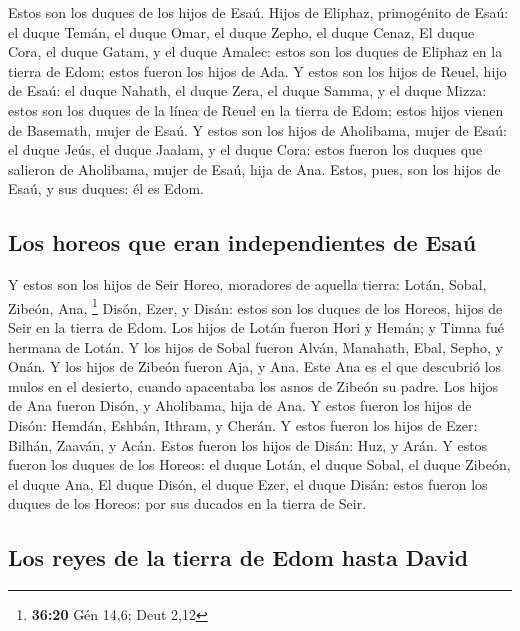  Estos son los duques de los hijos de Esaú. Hijos de
Eliphaz, primogénito de Esaú: el duque Temán, el duque Omar, el duque
Zepho, el duque Cenaz,  El duque Cora, el duque Gatam, y el
duque Amalec: estos son los duques de Eliphaz en la tierra de Edom;
estos fueron los hijos de Ada.  Y estos son los hijos de
Reuel, hijo de Esaú: el duque Nahath, el duque Zera, el duque Samma, y
el duque Mizza: estos son los duques de la línea de Reuel en la tierra
de Edom; estos hijos vienen de Basemath, mujer de Esaú.  Y
estos son los hijos de Aholibama, mujer de Esaú: el duque Jeús, el duque
Jaalam, y el duque Cora: estos fueron los duques que salieron de
Aholibama, mujer de Esaú, hija de Ana.  Estos, pues, son
los hijos de Esaú, y sus duques: él es Edom.

\hypertarget{los-horeos-que-eran-independientes-de-esauxfa}{%
\subsection{Los horeos que eran independientes de
Esaú}\label{los-horeos-que-eran-independientes-de-esauxfa}}

 Y estos son los hijos de Seir Horeo, moradores de aquella
tierra: Lotán, Sobal, Zibeón, Ana, \footnote{\textbf{36:20} Gén 14,6;
  Deut 2,12}  Disón, Ezer, y Disán: estos son los duques de
los Horeos, hijos de Seir en la tierra de Edom.  Los hijos
de Lotán fueron Hori y Hemán; y Timna fué hermana de Lotán.
 Y los hijos de Sobal fueron Alván, Manahath, Ebal, Sepho,
y Onán.  Y los hijos de Zibeón fueron Aja, y Ana. Este Ana
es el que descubrió los mulos en el desierto, cuando apacentaba los
asnos de Zibeón su padre.  Los hijos de Ana fueron Disón, y
Aholibama, hija de Ana.  Y estos fueron los hijos de Disón:
Hemdán, Eshbán, Ithram, y Cherán.  Y estos fueron los hijos
de Ezer: Bilhán, Zaaván, y Acán.  Estos fueron los hijos de
Disán: Huz, y Arán.  Y estos fueron los duques de los
Horeos: el duque Lotán, el duque Sobal, el duque Zibeón, el duque Ana,
 El duque Disón, el duque Ezer, el duque Disán: estos
fueron los duques de los Horeos: por sus ducados en la tierra de Seir.

\hypertarget{los-reyes-de-la-tierra-de-edom-hasta-david}{%
\subsection{Los reyes de la tierra de Edom hasta
David}\label{los-reyes-de-la-tierra-de-edom-hasta-david}}

